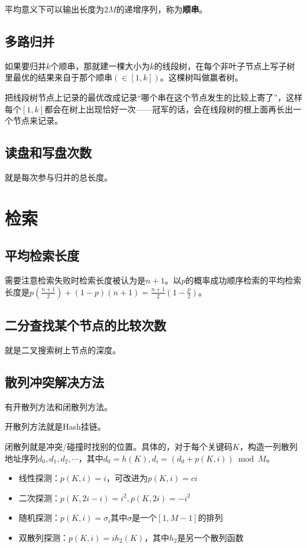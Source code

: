 \documentclass[8pt]{article}
\begin{document}
平均意义下可以输出长度为$2M$的递增序列，称为\textbf{顺串}。

\subsection{多路归并}
如果要归并$k$个顺串，那就建一棵大小为$k$的线段树，在每个非叶子节点上写子树里最优的结果来自于那个顺串$(\in [1, k])$。这棵树叫做赢者树。

把线段树节点上记录的最优改成记录“哪个串在这个节点发生的比较上寄了”，这样每个$[1, k]$都会在树上出现恰好一次——冠军的话，会在线段树的根上面再长出一个节点来记录。

\subsection{读盘和写盘次数}
就是每次参与归并的总长度。

\section{检索}

\subsection{平均检索长度}

需要注意检索失败时检索长度被认为是$n+1$。以$p$的概率成功顺序检索的平均检索长度是$p(\frac{n+1}{2}) + (1-p)(n+1) = \frac{n+1}{2}(1 - \frac p2)$。

\subsection{二分查找某个节点的比较次数}

就是二叉搜索树上节点的深度。

\subsection{散列冲突解决方法}

有开散列方法和闭散列方法。

开散列方法就是Hash挂链。

闭散列就是冲突/碰撞时找别的位置。具体的，对于每个关键码$K$，构造一列散列地址序列$d_0, d_1, d_2, \cdots$，其中$d_0 = h(K), d_i = (d_0 + p(K, i)) \bmod M$。
\begin{itemize}
	\item 线性探测：$p(K, i) = i$，可改进为$p(K, i) = ci$
	\item 二次探测：$p(K, 2i-i) = i^2, p(K, 2i) = -i^2$
	\item 随机探测：$p(K, i) = \sigma_i$其中$\sigma$是一个$[1, M-1]$的排列
	\item 双散列探测：$p(K, i) = ih_2(K)$，其中$h_2$是另一个散列函数
\end{itemize}
\end{document}
